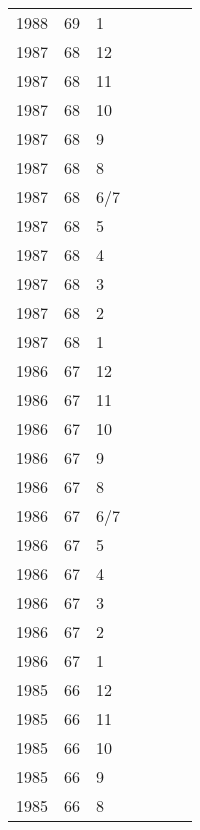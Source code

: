 \begin{longtable}{ |l|l|l|l|p{2.7cm}|l|p{2cm}| }
 1988 & 69 &     1 &         &                &  & \\
 1987 & 68 &    12 &         &                &  & \\
 1987 & 68 &    11 &         &                &  & \\
 1987 & 68 &    10 &         &                &  & \\
 1987 & 68 &     9 &         &                &  & \\
 1987 & 68 &     8 &         &                &  & \\
 1987 & 68 &   6/7 &         &                &  & \\
 1987 & 68 &     5 &         &                &  & \\
 1987 & 68 &     4 &         &                &  & \\
 1987 & 68 &     3 &         &                &  & \\
 1987 & 68 &     2 &         &                &  & \\
 1987 & 68 &     1 &         &                &  & \\
 1986 & 67 &    12 &         &                &  & \\
 1986 & 67 &    11 &         &                &  & \\
 1986 & 67 &    10 &         &                &  & \\
 1986 & 67 &     9 &         &                &  & \\
 1986 & 67 &     8 &         &                &  & \\
 1986 & 67 &   6/7 &         &                &  & \\
 1986 & 67 &     5 &         &                &  & \\
 1986 & 67 &     4 &         &                &  & \\
 1986 & 67 &     3 &         &                &  & \\
 1986 & 67 &     2 &         &                &  & \\
 1986 & 67 &     1 &         &                &  & \\
 1985 & 66 &    12 &         &                &  & \\
 1985 & 66 &    11 &         &                &  & \\
 1985 & 66 &    10 &         &                &  & \\
 1985 & 66 &     9 &         &                &  & \\
 1985 & 66 &     8 &         &                &  & \\

\end{longtable}
